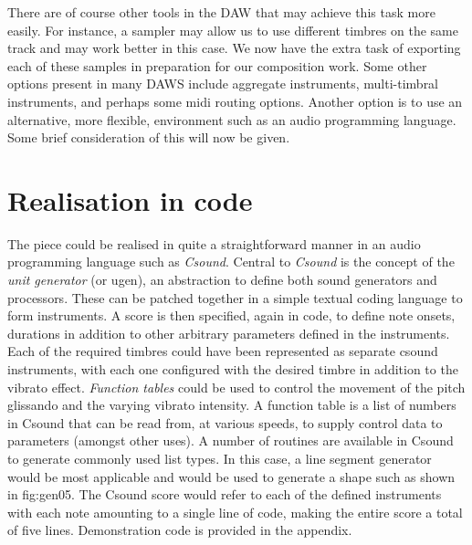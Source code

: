 \documentclass[12pt]{report}
\begin{document}
There are of course other tools in the DAW that may achieve this task more
easily. For instance, a sampler may allow us to use different timbres on the
same track and may work better in this case. We now have the extra task of
exporting each of these samples in preparation for our composition work. Some
other options present in many DAWS include aggregate instruments, multi-timbral
instruments, and perhaps some midi routing options. Another option is to use an
alternative, more flexible, environment such as an audio programming language.
Some brief consideration of this will now be given.

\section{Realisation in code}
\label{sec:org64567ed}
The piece could be realised in quite a straightforward manner in an audio
programming language such as \emph{Csound}. Central to \emph{Csound} is the concept of the
\emph{unit generator} (or ugen), an abstraction to define both sound generators and
processors. These can be patched together in a simple textual coding language to
form instruments. A score is then specified, again in code, to define note
onsets, durations in addition to other arbitrary parameters defined in the
instruments. Each of the required timbres could have been represented as
separate csound instruments, with each one configured with the desired timbre in
addition to the vibrato effect. \emph{Function tables} could be used to control the
movement of the pitch glissando and the varying vibrato intensity. A function
table is a list of numbers in Csound that can be read from, at various speeds,
to supply control data to parameters (amongst other uses). A number of routines
are available in Csound to generate commonly used list types. In this case, a
line segment generator would be most applicable and would be used to generate a
shape such as shown in fig:gen05. The Csound score would refer to each of the
defined instruments with each note amounting to a single line of code, making
the entire score a total of five lines. Demonstration code is provided in the
appendix.
\end{document}
